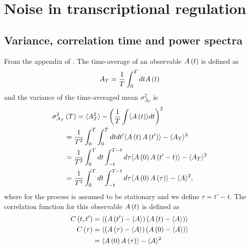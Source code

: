 \section{Noise in transcriptional regulation}

\subsection{ Variance, correlation time and power spectra}
From the appendix of \cite{DeRonde2012}. The time-average of an observable $A\left ( t\right )$\cite{Frenkel2002} is defined as
\begin{align}
\elabel{si:time_av_mean}
A_T=\frac{1}{T}\int_0^T dt A\br{t}
\end{align}
and the variance of the time-averaged mean $\sigma^2_{A_T}$ is
\begin{align}
\sigma^2_{A_T}&\br{T}=\avg{A^2_T}-\br{\frac{1}{T}\int \avg{A\br{t}}dt}^2\\
&=\frac{1}{T^2}\int_0^T  \int_0^T dt dt' \avg{A\br{t}A\br{t'}}-\avg{A_T}^2\\
\elabel{si:time_av_var2}
&=\frac{1}{T^2}\int_0^T dt \int_{-t}^{T-t} d\tau \avg{A\br{0}A\br{t'-t}}-\avg{A_T}^2\\
\elabel{si:time_av_var3}
&=\frac{1}{T^2}\int_0^T dt\int_{-t}^{T-t} d\tau \avg{A\br{0}A\br{\tau}}-\avg{A}^2,
\end{align}
where for  the process is assumed to be stationary and we define $\tau=t'-t$.
The correlation function for this observable $A\left ( t\right )$ is defined as
\begin{align}
\elabel{si:time_corr_ens}
C\br{t,t'}&=\avg{\br{A\br{t'}-\avg{A}}\br{A\br{t}-\avg{A}}}\\
\elabel{si:time_corr_ens_1}
C\br{\tau}&=\avg{\br{A\br{\tau}-\avg{A}}\br{A\br{0}-\avg{A}}}\\
\elabel{si:time_corr_ens_2}
&=\avg{A\br{0}A\br{\tau}}-\avg{A}^2
\end{align}

